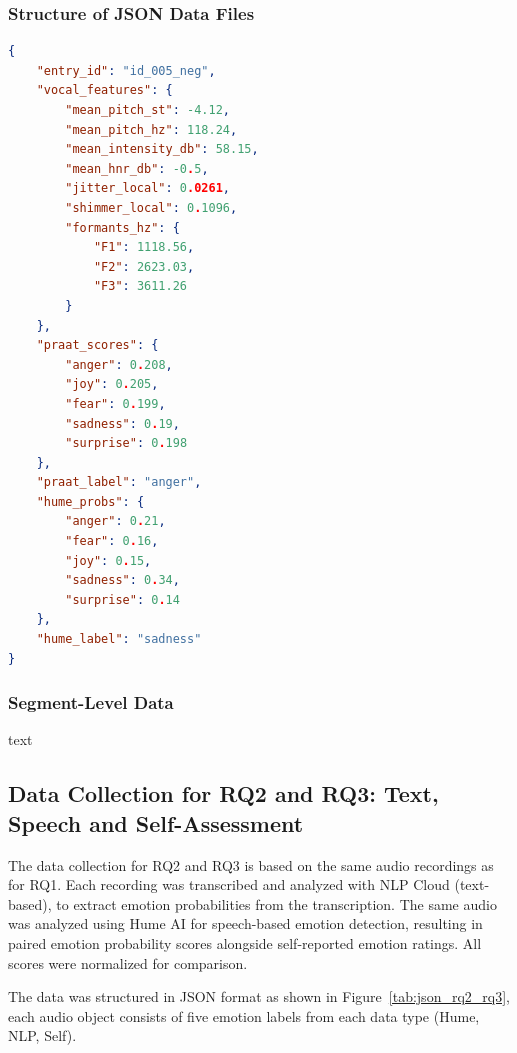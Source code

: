 \subsubsection{Structure of JSON Data Files}
\begin{center}
\begin{minipage}{0.7\textwidth} 
\begin{lstlisting}[language=json, caption={Example of stored JSON structure for vocal features vs. Hume}]
    {
    "entry_id": "id_005_neg",
    "vocal_features": {
        "mean_pitch_st": -4.12,
        "mean_pitch_hz": 118.24,
        "mean_intensity_db": 58.15,
        "mean_hnr_db": -0.5,
        "jitter_local": 0.0261,
        "shimmer_local": 0.1096,
        "formants_hz": {
            "F1": 1118.56,
            "F2": 2623.03,
            "F3": 3611.26
        }
    },
    "praat_scores": {
        "anger": 0.208,
        "joy": 0.205,
        "fear": 0.199,
        "sadness": 0.19,
        "surprise": 0.198
    },
    "praat_label": "anger",
    "hume_probs": {
        "anger": 0.21,
        "fear": 0.16,
        "joy": 0.15,
        "sadness": 0.34,
        "surprise": 0.14
    },
    "hume_label": "sadness"
}
\end{lstlisting}
\end{minipage}
\end{center} 
\subsubsection{Segment-Level Data}
text

\subsection{Data Collection for RQ2 and RQ3: Text, Speech and Self-Assessment}


The data collection for RQ2 and RQ3 is based on the same audio recordings as for RQ1. 
Each recording was transcribed and analyzed with NLP Cloud (text-based), to extract emotion probabilities from the transcription. The same audio was analyzed using Hume AI for speech-based emotion detection, resulting in paired emotion probability scores alongside self-reported emotion ratings. All scores were normalized for comparison.

The data was structured in JSON format as shown in Figure~\ref{tab:json_rq2_rq3}, each audio object consists of five emotion labels from each data type (Hume, NLP, Self). 

